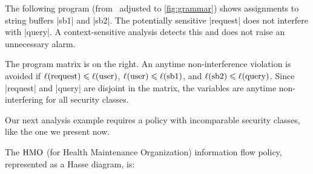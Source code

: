 \begin{example}\label{ex:sql}
The following program (from~\cite{huang2014} adjusted to \autoref{fig:grammar})
shows assignments to string buffers \prc|sb1| and \prc|sb2|.
The potentially sensitive \prc|request| does not interfere with \prc|query|.
A context-sensitive analysis detects this and does not raise an unnecessary alarm.

\begin{center}
\begin{minipage}{.6\textwidth}
\end{minipage}\hfill%
\begin{minipage}{.30\textwidth}
\end{minipage}
\end{center}

The program matrix is on the right.
An anytime non-interference violation is avoided if
\(\lvl{\prc|request|} \leqslant \lvl{\prc|user|}\),
\(\lvl{\prc|user|} \leqslant \lvl{\prc|sb1|}\), and
\(\lvl{\prc|sb2|} \leqslant \lvl{\prc|query|}\).
Since \prc|request| and \prc|query| are disjoint in the matrix, the variables
are anytime non-interfering for all security classes.

\end{example}

Our next analysis example requires a policy with incomparable security classes,
like the one we present now.

\begin{example}\label{ex-hasse-diagram-HMO} The
\(\mathrm{HMO}\) (for Health Maintenance Organization) information flow policy,
represented as a Hasse diagram, is:

\begin{center}
\begin{minipage}{.8\textwidth}
{\centering


}
\end{minipage}
\end{center}
 \end{example}

